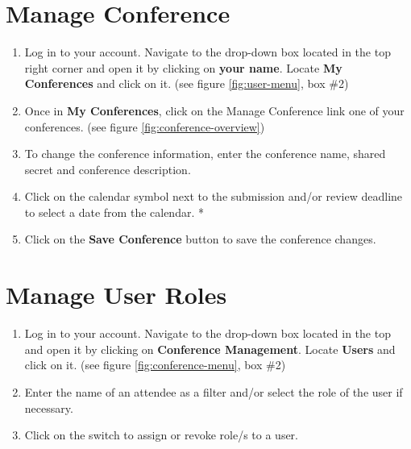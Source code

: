 \documentclass[nochapterpage,nopartpage,noheadingspace,numbersubsubsec,bigchapter,colorback,accentcolor=tud9c,10pt]{tudreport}
\begin{document}
	\section{Manage Conference}


\begin{enumerate}
	\item	Log in to your account. Navigate to the drop-down box located in the top right corner and open it by clicking on \textbf{your name}. Locate \textbf{My Conferences} and click on it. (see figure \ref{fig:user-menu}, box \#2)
	\item	Once in \textbf{My Conferences}, click on the Manage Conference link one of your conferences. (see figure \ref{fig:conference-overview})
	\item	To change the conference information, enter the conference name, shared secret and conference description.
	\item	Click on the calendar symbol next to the submission and/or review deadline to select a date from the calendar. *
	\item	Click on the \textbf{Save Conference} button to save the conference changes.
\end{enumerate}

	\section{Manage User Roles}


\begin{enumerate}
	\item	Log in to your account. Navigate to the drop-down box located in the top and open it by clicking on \textbf{Conference Management}. Locate \textbf{Users} and click on it. (see figure \ref{fig:conference-menu}, box \#2)
	\item	Enter the name of an attendee as a filter and/or select the role of the user if necessary.
	\item	Click on the switch to assign or revoke role/s to a user.
\end{enumerate}
\end{document}
